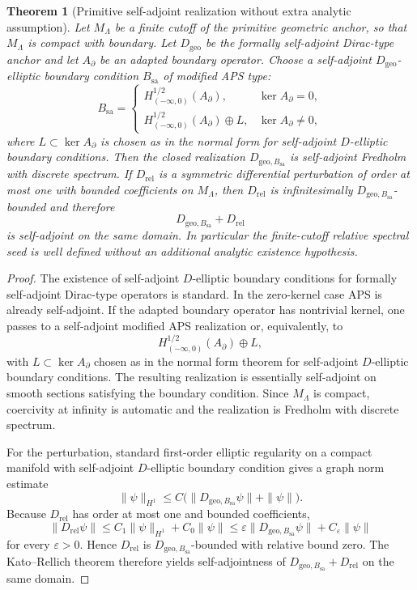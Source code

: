 \documentclass[11pt,a4paper]{article}
\newtheorem{theorem}{Theorem}[section]
\theoremstyle{definition}
\theoremstyle{remark}
\begin{document}
\begin{theorem}[Primitive self-adjoint realization without extra analytic assumption]
\label{thm:well-posed-primitive-dynamics}
\label{thm:primitive-selfadjoint-realization}
Let $M_\Lambda$ be a finite cutoff of the primitive geometric anchor, so that $M_\Lambda$ is
compact with boundary. Let $D_{\mathrm{geo}}$ be the formally self-adjoint Dirac-type anchor and
let $A_\partial$ be an adapted boundary operator. Choose a self-adjoint $D_{\mathrm{geo}}$-elliptic
boundary condition $B_{\mathrm{sa}}$ of modified APS type:
\[
B_{\mathrm{sa}}=
\begin{cases}
H^{1/2}_{(-\infty,0)}(A_\partial), & \ker A_\partial=0,\\[2mm]
H^{1/2}_{(-\infty,0)}(A_\partial)\oplus L, & \ker A_\partial\neq0,
\end{cases}
\]
where $L\subset\ker A_\partial$ is chosen as in the normal form for self-adjoint $D$-elliptic
boundary conditions. Then the closed realization $D_{\mathrm{geo},B_{\mathrm{sa}}}$ is self-adjoint
Fredholm with discrete spectrum. If $D_{\mathrm{rel}}$ is a symmetric differential perturbation of
order at most one with bounded coefficients on $M_\Lambda$, then $D_{\mathrm{rel}}$ is
infinitesimally $D_{\mathrm{geo},B_{\mathrm{sa}}}$-bounded and therefore
\[
D_{\mathrm{geo},B_{\mathrm{sa}}}+D_{\mathrm{rel}}
\]
is self-adjoint on the same domain. In particular the finite-cutoff relative spectral seed is well
defined without an additional analytic existence hypothesis.
\end{theorem}

\begin{proof}
The existence of self-adjoint $D$-elliptic boundary conditions for formally self-adjoint Dirac-type
operators is standard. In the zero-kernel case APS is already self-adjoint. If the adapted
boundary operator has nontrivial kernel, one passes to a self-adjoint modified APS realization or,
equivalently, to
\[
H^{1/2}_{(-\infty,0)}(A_\partial)\oplus L,
\]
with $L\subset\ker A_\partial$ chosen as in the normal form theorem for self-adjoint $D$-elliptic
boundary conditions. The resulting realization is essentially self-adjoint on smooth sections
satisfying the boundary condition. Since $M_\Lambda$ is compact, coercivity at infinity is
automatic and the realization is Fredholm with discrete spectrum.

For the perturbation, standard first-order elliptic regularity on a compact manifold with
self-adjoint $D$-elliptic boundary condition gives a graph norm estimate
\[
\|\psi\|_{H^1}\le C\bigl(\|D_{\mathrm{geo},B_{\mathrm{sa}}}\psi\|+\|\psi\|\bigr).
\]
Because $D_{\mathrm{rel}}$ has order at most one and bounded coefficients,
\[
\|D_{\mathrm{rel}}\psi\|
\le
C_1\|\psi\|_{H^1}+C_0\|\psi\|
\le
\varepsilon\|D_{\mathrm{geo},B_{\mathrm{sa}}}\psi\|+C_\varepsilon\|\psi\|
\]
for every $\varepsilon>0$. Hence $D_{\mathrm{rel}}$ is $D_{\mathrm{geo},B_{\mathrm{sa}}}$-bounded
with relative bound zero. The Kato--Rellich theorem therefore yields self-adjointness of
$D_{\mathrm{geo},B_{\mathrm{sa}}}+D_{\mathrm{rel}}$ on the same domain.
\end{proof}
\end{document}
